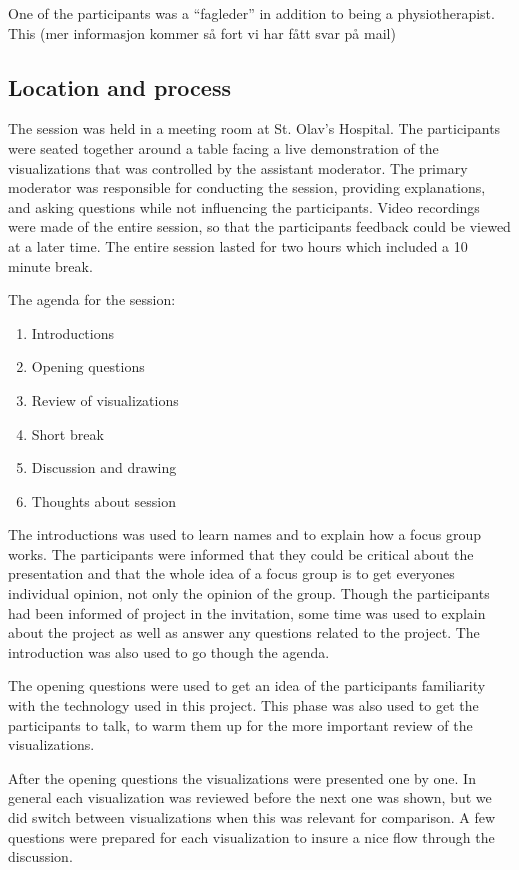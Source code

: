 One of the participants was a ``fagleder'' in addition to being a physiotherapist. This (mer informasjon kommer så fort vi har fått svar på mail)

\subsection{Location and process}
The session was held in a meeting room at St. Olav's Hospital. The participants were seated together around a table facing a live demonstration of the visualizations that was controlled by the assistant moderator. The primary moderator was responsible for conducting the session, providing explanations, and asking questions while not influencing the participants. Video recordings were made of the entire session, so that the participants feedback could be viewed at a later time. The entire session lasted for two hours which included a 10 minute break.

The agenda for the session:
\vspace{-8mm}
\begin{enumerate}[itemsep=0cm, parsep=0cm]
  \item Introductions
  \item Opening questions
  \item Review of visualizations
  \item Short break
  \item Discussion and drawing
  \item Thoughts about session
\end{enumerate}

The introductions was used to learn names and to explain how a focus group works. The participants were informed that they could be critical about the presentation and that the whole idea of a focus group is to get everyones individual opinion, not only the opinion of the group. Though the participants had been informed of project in the invitation, some time was used to explain about the project as well as answer any questions related to the project. The introduction was also used to go though the agenda.

The opening questions were used to get an idea of the participants familiarity with the technology used in this project. This phase was also used to get the participants to talk, to warm them up for the more important review of the visualizations.

After the opening questions the visualizations were presented one by one. In general each visualization was reviewed before the next one was shown, but we did switch between visualizations when this was relevant for comparison. A few questions were prepared for each visualization to insure a nice flow through the discussion.

